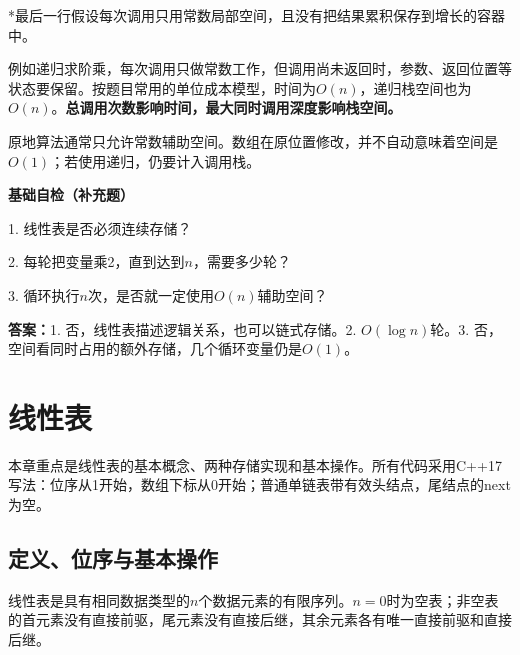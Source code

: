 \hypertarget{ds1-space-star}{}

*最后一行假设每次调用只用常数局部空间，且没有把结果累积保存到增长的容器中。


\hypertarget{ds1-constant}{}


\hypertarget{ds1-recursion}{}

例如递归求阶乘，每次调用只做常数工作，但调用尚未返回时，参数、返回位置等状态要保留。按题目常用的单位成本模型，时间为$O(n)$，递归栈空间也为$O(n)$。\textbf{总调用次数影响时间，最大同时调用深度影响栈空间。}


\hypertarget{ds1-inplace}{}

原地算法通常只允许常数辅助空间。数组在原位置修改，并不自动意味着空间是$O(1)$；若使用递归，仍要计入调用栈。


\hypertarget{ds1-recall}{}

\begin{recallcard}[检查是否理解条件]
\textbf{基础自检（补充题）}

1. 线性表是否必须连续存储？\par
2. 每轮把变量乘2，直到达到$n$，需要多少轮？\par
3. 循环执行$n$次，是否就一定使用$O(n)$辅助空间？

\textbf{答案：}1. 否，线性表描述逻辑关系，也可以链式存储。2. $O(\log n)$轮。3. 否，空间看同时占用的额外存储，几个循环变量仍是$O(1)$。
\end{recallcard}

\chapter{线性表}
\hypertarget{ds2-intro}{}

本章重点是线性表的基本概念、两种存储实现和基本操作。所有代码采用C++17写法：位序从1开始，数组下标从0开始；普通单链表带有效头结点，尾结点的next为空。


\hypertarget{ds2-basics}{}

\section{定义、位序与基本操作}\label{ds2-basics}

\hypertarget{ds2-definition}{}

\begin{definition}[线性表]
线性表是具有相同数据类型的$n$个数据元素的有限序列。$n=0$时为空表；非空表的首元素没有直接前驱，尾元素没有直接后继，其余元素各有唯一直接前驱和直接后继。
\end{definition}


